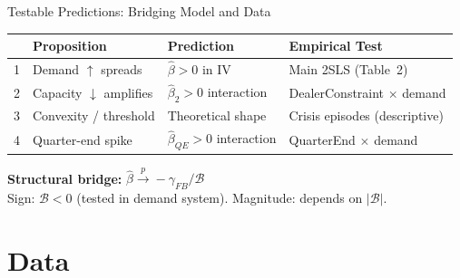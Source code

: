 \documentclass[aspectratio=169, 10pt]{beamer}
\newcommand{\calB}{\mathcal{B}}      %
\begin{document}
\begin{frame}{Testable Predictions: Bridging Model and Data}

  \begin{center}
  \begin{tabular}{clll}
    \toprule
    & Proposition & Prediction & Empirical Test \\
    \midrule
    1 & Demand $\uparrow$ spreads & $\hat\beta > 0$ in IV & Main 2SLS (Table~2) \\
    2 & Capacity $\downarrow$ amplifies & $\hat\beta_2 > 0$ interaction & DealerConstraint $\times$ demand \\
    3 & Convexity / threshold & Theoretical shape & Crisis episodes (descriptive) \\
    4 & Quarter-end spike & $\hat\beta_{QE} > 0$ interaction & QuarterEnd $\times$ demand \\
    \bottomrule
  \end{tabular}
  \end{center}

  \bigskip

  \textbf{Structural bridge:} $\hat\beta \xrightarrow{p} -\gamma_{FB}/\calB$\\
  {\color{dimgray}\small Sign: $\calB < 0$ (tested in demand system). Magnitude: depends on $|\calB|$.}

\end{frame}

\section{Data}
\end{document}

